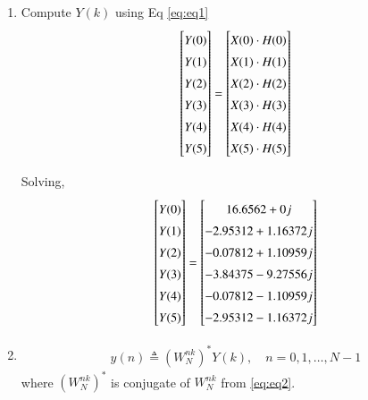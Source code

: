 \documentclass[journal,12pt,twocolumn]{IEEEtran}
\renewcommand\thesection{\arabic{section}}
\begin{document}
\begin{enumerate}[label=\thesection.\arabic*.,ref=\thesection.\theenumi]
\item Compute $Y(k)$ using 	Eq \eqref{eq:eq1}
\begin{equation}
\renewcommand{\arraystretch}{1.45}
\setlength\arraycolsep{0.01pt}
\begin{bmatrix} 
Y(0) \\ Y(1) \\ Y(2) \\ Y(3) \\ Y(4) \\ Y(5) 
\end{bmatrix}
=
\begin{bmatrix}
X(0)\cdot H(0) \\ X(1)\cdot H(1) \\ X(2)\cdot H(2) \\ X(3)\cdot H(3) \\ X(4)\cdot H(4) \\ X(5)\cdot H(5)
\end{bmatrix}
\end{equation}

Solving,
\begin{equation}
\renewcommand{\arraystretch}{1.45}
\setlength\arraycolsep{0.01pt}
\begin{bmatrix} 
Y(0) \\ Y(1) \\ Y(2) \\ Y(3) \\ Y(4) \\ Y(5) 
\end{bmatrix}
=
\begin{bmatrix}
16.6562+0j \\ -2.95312+1.16372j \\ -0.07812+1.10959j \\ -3.84375-9.27556j \\ -0.07812-1.10959j \\ -2.95312-1.16372j 
\end{bmatrix}
\end{equation}

\item
\begin{align}
    y(n) \triangleq (W_{N}^{nk})^{*} Y(k), \quad n=0,1, \ldots, N-1
    \label{eq:eq3}
\end{align}
where $(W_{N}^{nk})^{*}$ is conjugate of $W_{N}^{nk}$ from \eqref{eq:eq2}.


\end{enumerate}
\end{document}
